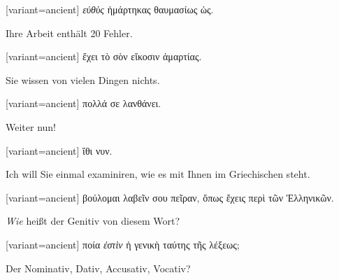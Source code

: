 \switchcolumn

\begin{greek}[variant=ancient]%
\emph{εὐθὺς} ἡμάρτηκας θαυμασίως ὡς.

\end{greek}%
\switchcolumn*

Ihre Arbeit enthält 20 Fehler. 

\switchcolumn

\begin{greek}[variant=ancient]%
ἔχει τὸ σὸν εἴκοσιν ἁμαρτίας.

\end{greek}%
\switchcolumn*

Sie wissen von vielen Dingen nichts. 

\switchcolumn

\begin{greek}[variant=ancient]%
πολλά σε λανθάνει.

\end{greek}%
Weiter nun!

\switchcolumn

\begin{greek}[variant=ancient]%
ἴθι νυν.

\end{greek}%
\switchcolumn*

Ich will Sie einmal examiniren, wie es mit Ihnen im Griechischen steht. 

\switchcolumn

\begin{greek}[variant=ancient]%
βούλομαι λαβεῖν σου πεῖραν, ὅπως ἔχεις περὶ τῶν Ἑλληνικῶν.

\end{greek}%
\switchcolumn*

\emph{Wie} heißt der Genitiv von diesem Wort? 

\switchcolumn

\begin{greek}[variant=ancient]%
ποία \emph{ἐστὶν} ἡ γενικὴ ταύτης τῆς λέξεως;

\end{greek}%
\switchcolumn*

Der Nominativ, Dativ, Accusativ, Vocativ? 

\switchcolumn

